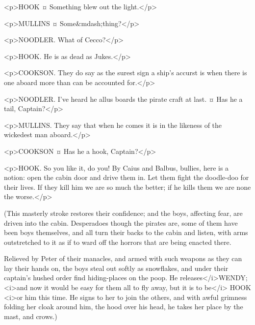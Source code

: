 <p>HOOK ¤
Something blew out the light.</p>

<p>MULLINS ¤
Some&mdash;thing?</p>

<p>NOODLER. What of Cecco?</p>

<p>HOOK. He is as dead as Jukes.</p>


<p>COOKSON. They do say as the surest sign a ship's accurst is when there is one aboard more than can be accounted for.</p>

<p>NOODLER. I've heard he allus boards the pirate craft at last.
¤
Has he a tail, Captain?</p>

<p>MULLINS. They say that when he comes it is in the likeness of the wickedest man aboard.</p>

<p>COOKSON ¤
Has he a hook, Captain?</p>


<p>HOOK. So you like it, do you! By Caius and Balbus, bullies, here is a notion: open the cabin door and drive them in. Let them fight the doodle-doo for their lives. If they kill him we are so much the better; if he kills them we are none the worse.</p>

\begin{stagedir}
(This masterly stroke restores their confidence; and the boys, affecting fear, are driven into the cabin. Desperadoes though the pirates are, some of them have been boys themselves, and all turn their backs to the cabin and listen, with arms outstretched to it as if to ward off the horrors that are being enacted there.

Relieved by Peter of their manacles, and armed with such weapons as they can lay their hands on, the boys steal out softly as snowflakes, and under their captain's hushed order find hiding-places on the poop. He releases</i>WENDY; <i>and now it would be easy for them all to fly away, but it is to be</i> HOOK <i>or him this time. He signs to her to join the others, and with awful grimness folding her cloak around him, the hood over his head, he takes her place by the mast, and crows.)
\end{stagedir}

